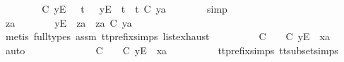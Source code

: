 \begin{isabellebody}
\ \ \ \ \isamarkupfalse%
\ \isamarkupfalse%
\ {\isachardoublequoteopen}{\isasymsigma}{\isacharprime}\ {\isasymle}\isactrlsub C\ {\isacharbrackleft}{\isacharbrackleft}y{\isacharbrackright}\isactrlsub E{\isacharbrackright}\ \ {\isasymor}\ {\isacharparenleft}{\isasymexists}t{\isacharprime}{\isachardot}\ {\isasymsigma}{\isacharprime}\ {\isacharequal}\ {\isacharbrackleft}y{\isacharbrackright}\isactrlsub E\ {\isacharhash}\ t{\isacharprime}\ {\isasymand}\ t{\isacharprime}\ {\isasymle}\isactrlsub C\ ya{\isacharparenright}{\isachardoublequoteclose}\isanewline
\ \ \ \ \ \ \isamarkupfalse%
\ simp\isanewline
\ \ \ \ \isamarkupfalse%
\ \isamarkupfalse%
\ za\ \ {\isachardoublequoteopen}{\isasymsigma}{\isacharprime}\ {\isacharequal}\ {\isacharbrackleft}{\isacharbrackright}\ {\isasymor}\ {\isacharparenleft}{\isasymsigma}{\isacharprime}\ {\isacharequal}\ {\isacharbrackleft}y{\isacharbrackright}\isactrlsub E\ {\isacharhash}\ za\ {\isasymand}\ za\ {\isasymle}\isactrlsub C\ ya{\isacharparenright}{\isachardoublequoteclose}\isanewline
\ \ \ \ \ \ \isamarkupfalse%
\ {\isacharparenleft}metis\ {\isacharparenleft}full{\isacharunderscore}types{\isacharparenright}\ assm{}\ tt{\isacharunderscore}prefix{\isachardot}simps{\isacharparenleft}{}{\isacharparenright}\ list{\isachardot}exhaust{\isacharparenright}\isanewline
\ \ \ \ \isamarkupfalse%
\ \isamarkupfalse%
\ {\isachardoublequoteopen}{\isasymexists}{\isasymrho}{\isacharprime}{\isachardot}\ {\isasymrho}{\isacharprime}\ {\isasymsubseteq}\isactrlsub C\ {\isasymsigma}{\isacharprime}\ {\isasymand}\ {\isasymrho}{\isacharprime}\ {\isasymle}\isactrlsub C\ {\isacharbrackleft}y{\isacharbrackright}\isactrlsub E\ {\isacharhash}\ xa{\isachardoublequoteclose}\isanewline
\ \ \ \ \isamarkupfalse%
\ auto\isanewline
\ \ \ \ \ \ \isamarkupfalse%
\ {\isachardoublequoteopen}{\isasymsigma}{\isacharprime}\ {\isacharequal}\ {\isacharbrackleft}{\isacharbrackright}\ {\isasymLongrightarrow}\ {\isasymexists}{\isasymrho}{\isacharprime}{\isachardot}\ {\isasymrho}{\isacharprime}\ {\isasymsubseteq}\isactrlsub C\ {\isacharbrackleft}{\isacharbrackright}\ {\isasymand}\ {\isasymrho}{\isacharprime}\ {\isasymle}\isactrlsub C\ {\isacharbrackleft}y{\isacharbrackright}\isactrlsub E\ {\isacharhash}\ xa{\isachardoublequoteclose}\isanewline
\ \ \ \ \ \ \ \ \isamarkupfalse%
\ tt{\isacharunderscore}prefix{\isachardot}simps{\isacharparenleft}{}{\isacharparenright}\ tt{\isacharunderscore}subset{\isachardot}simps{\isacharparenleft}{}{\isacharparenright}\ \isamarkupfalse%

\end{isabellebody}
